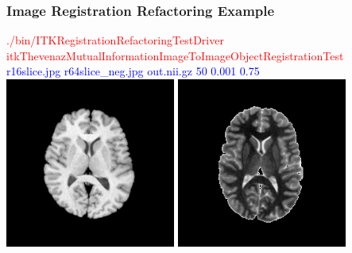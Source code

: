 \begin{frame}
\frametitle{Image Registration Refactoring Example}
\textcolor{red}{./bin/ITKRegistrationRefactoringTestDriver itkThevenazMutualInformationImageToImageObjectRegistrationTest }\\
\textcolor{blue}{r16slice.jpg r64slice\_neg.jpg out.nii.gz  50 0.001 0.75 }\\
\includegraphics[height=2.2in]{../Art/r16slice.jpg}
\includegraphics[height=2.2in]{../Art/r64slice_neg.jpg}
\end{frame}


